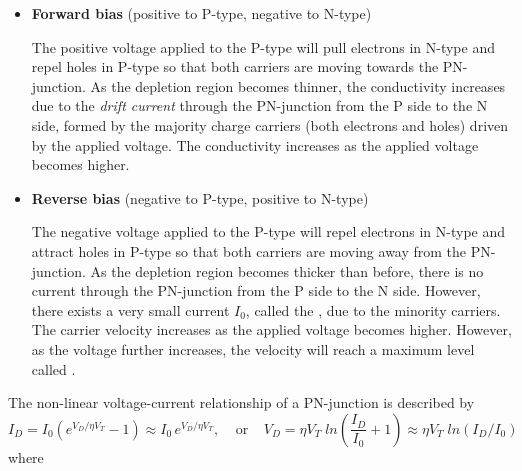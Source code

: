 \documentclass{article}
\begin{document}
\begin{itemize}
\item {\bf Forward bias} (positive to P-type, negative to N-type)

  The positive voltage applied to the P-type will pull electrons in N-type
  and repel holes in P-type so that both carriers are moving towards the 
  PN-junction. As the depletion region becomes thinner, the conductivity 
  increases due to the {\em drift current} through the PN-junction from 
  the P side to the N side, formed by the majority charge carriers (both 
  electrons and holes) driven by the applied voltage. The conductivity 
  increases as the applied voltage becomes higher. 

\item {\bf Reverse bias} (negative to P-type, positive to N-type)

  The negative voltage applied to the P-type will repel electrons in N-type
  and attract holes in P-type so that both carriers are moving away from 
  the PN-junction. As the depletion region becomes thicker than before, 
  there is no current through the PN-junction from the P side to the N side.
  However, there exists a very small current $I_0$, called the 
  ,
  due to the minority carriers.
  The carrier velocity increases as the applied voltage becomes higher. 
  However, as the voltage further increases, the velocity will reach a 
  maximum level called
  .

  

\end{itemize}
The non-linear voltage-current relationship of a PN-junction is described by
\begin{equation}
  I_D=I_0 \left( e^{V_D/\eta V_T}-1 \right)\approx I_0\,e^{V_D/\eta V_T},
  \;\;\;\;\mbox{or}\;\;\;\;
  V_D=\eta V_T\;ln \left(\frac{I_D}{I_0}+1\right)\approx\eta V_T\;ln (I_D/I_0)
\end{equation}
where 
\end{document}
